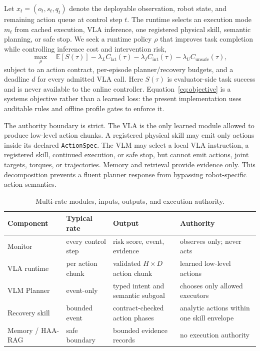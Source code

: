\documentclass[runningheads]{waica}
\begin{document}
Let $x_t=(o_t,s_t,q_t)$ denote the deployable observation, robot state, and
remaining action queue at control step $t$. The runtime selects an execution
mode $m_t$ from cached execution, VLA inference, one registered physical skill,
semantic planning, or safe stop. We seek a runtime policy $\rho$ that improves
task completion while controlling inference cost and intervention risk,
\begin{equation}
\max_{\rho}\quad
\mathbb{E}\!\left[S(\tau)\right]
-\lambda_L C_{\mathrm{lat}}(\tau)
-\lambda_I C_{\mathrm{int}}(\tau)
-\lambda_U C_{\mathrm{unsafe}}(\tau),
\label{eq:objective}
\end{equation}
subject to an action contract, per-episode planner/recovery budgets, and a
deadline $d$ for every admitted VLA call. Here $S(\tau)$ is evaluator-side task
success and is never available to the online controller. Equation~\ref{eq:objective}
is a systems objective rather than a learned loss: the present implementation
uses auditable rules and offline profile gates to enforce it.

The authority boundary is strict. The VLA is the only learned module allowed
to produce low-level action chunks. A registered physical skill may emit only
actions inside its declared \texttt{ActionSpec}. The VLM may select a local VLA
instruction, a registered skill, continued execution, or safe stop, but cannot
emit actions, joint targets, torques, or trajectories. Memory and retrieval
provide evidence only. This decomposition prevents a fluent planner response
from bypassing robot-specific action semantics.

\begin{table}
\caption{Multi-rate modules, inputs, outputs, and execution authority.}
\label{tab:authority}
\centering
\small
\begin{tabularx}{\textwidth}{p{}p{}p{}X}
\toprule
Component & Typical rate & Output & Authority \\
\midrule
Monitor & every control step & risk score, event, evidence & observes only; never acts \\
VLA runtime & per action chunk & validated $H\!\times\!D$ action chunk & learned low-level actions \\
VLM Planner & event-only & typed intent and semantic subgoal & chooses only allowed executors \\
Recovery skill & bounded event & contract-checked action phases & analytic actions within one skill envelope \\
Memory / HAA-RAG & safe boundary & bounded evidence records & no execution authority \\
\bottomrule
\end{tabularx}
\end{table}
\end{document}
